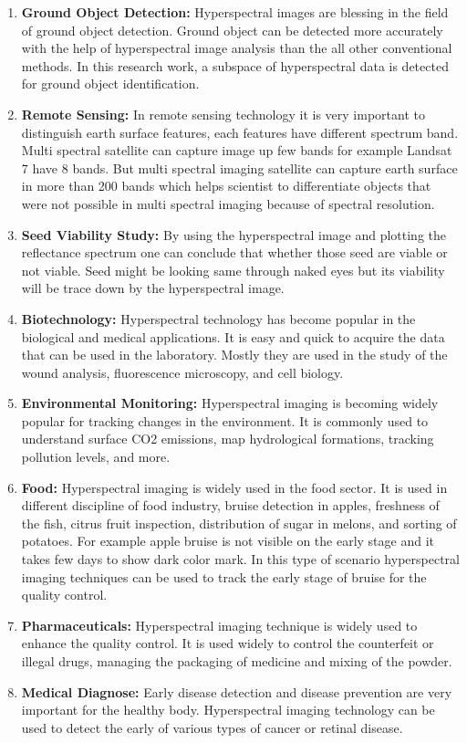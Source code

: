 \documentclass[document.tex]{subfiles}
\begin{document}
\begin{enumerate}
	\item \textbf{Ground Object Detection:} Hyperspectral images are blessing in the field of ground object detection. Ground object can be detected more accurately with the help of hyperspectral image analysis than the all other conventional methods. In this research work, a subspace of hyperspectral data is detected for ground object identification.
	\item \textbf{Remote Sensing:} In remote sensing technology it is very important to distinguish earth surface features, each features have different spectrum band. Multi spectral satellite can capture image up few bands for example Landsat 7 have 8 bands. But multi spectral imaging satellite can capture earth surface in more than 200 bands which helps scientist to differentiate objects that were not possible in multi spectral imaging because of spectral resolution.
	\item \textbf{Seed Viability Study: }By using the hyperspectral image and plotting the reflectance spectrum one can conclude that whether those seed are viable or not viable. Seed might be looking same through naked eyes but its viability will be trace down by the hyperspectral image.
	\item \textbf{Biotechnology:} Hyperspectral technology has become popular in the biological and medical applications. It is easy and quick to acquire the data that can be used in the laboratory. Mostly they are used in the study of the wound analysis, fluorescence microscopy, and cell biology.
	\item \textbf{Environmental Monitoring:} Hyperspectral imaging is becoming widely popular for tracking changes in the environment. It is commonly used to understand surface CO2 emissions, map hydrological formations, tracking pollution levels, and more.
	\item \textbf{Food: }Hyperspectral imaging is widely used in the food sector. It is used in different discipline of food industry, bruise detection in apples, freshness of the fish, citrus fruit inspection, distribution of sugar in melons, and sorting of potatoes. For example apple bruise is not visible on the early stage and it takes few days to show dark color mark. In this type of scenario hyperspectral imaging techniques can be used to track the early stage of bruise for the quality control.
	\item \textbf{Pharmaceuticals: } Hyperspectral imaging technique is widely used to enhance the quality control. It is used widely to control the counterfeit or illegal drugs, managing the packaging of medicine and mixing of the powder.
	\item \textbf{Medical Diagnose: }Early disease detection and disease prevention are very important for the healthy body. Hyperspectral imaging technology can be used to detect the early of various types of cancer or retinal disease.
\end{enumerate}
\end{document}
